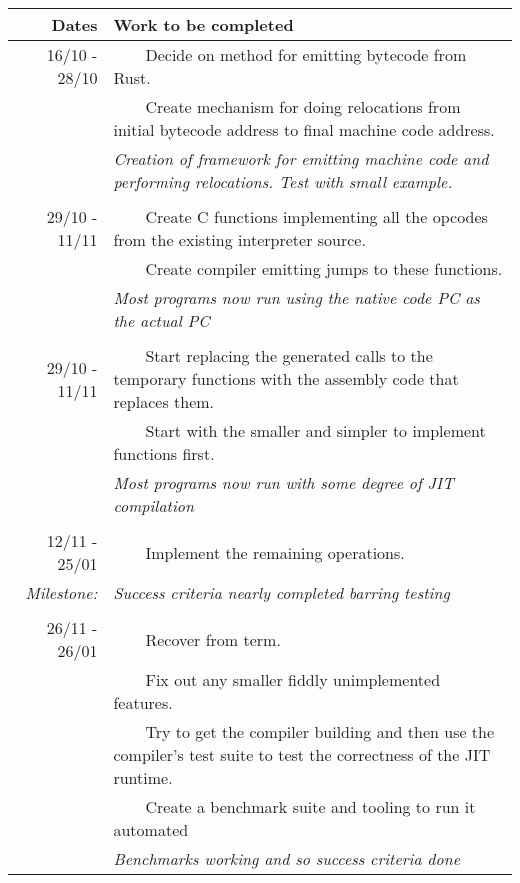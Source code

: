 \documentclass[12pt,a4paper, headings=standardclasses]{scrartcl}
\newcommand{\tabitem}{~~\llap{\textbullet}~~}
\begin{document}
\begin{tabularx}{\textwidth}{rX} \toprule
    Dates & Work to be completed \\ \midrule
    16/10 - 28/10
    &\tabitem Decide on method for emitting bytecode from Rust.\\
    &\tabitem Create mechanism for doing relocations from initial bytecode address to final machine code address.\\
    &\textit{Creation of framework for emitting machine code and performing relocations. Test with small example.} \\

    &\\

    29/10 - 11/11
    &\tabitem Create C functions implementing all the opcodes from the existing interpreter source.\\
    &\tabitem Create compiler emitting jumps to these functions.\\
    &\textit{Most programs now run using the native code PC as the actual PC} \\
    
    &\\

    29/10 - 11/11
    &\tabitem Start replacing the generated calls to the temporary functions with the assembly code that replaces them.\\
    &\tabitem Start with the smaller and simpler to implement functions first.\\
    &\textit{Most programs now run with some degree of JIT compilation} \\

    &\\

    12/11 - 25/01
    &\tabitem Implement the remaining operations.\\
    \textit{Milestone:}
    &\textit{Success criteria nearly completed barring testing} \\

    &\\

    26/11 - 26/01
    &\tabitem Recover from term.\\
    &\tabitem Fix out any smaller fiddly unimplemented features.\\
    &\tabitem Try to get the compiler building and then use the
        compiler's test suite to test the correctness of the JIT runtime.\\
    &\tabitem Create a benchmark suite and tooling to run it automated \\
    &\textit{Benchmarks working and so success criteria done} \\
\bottomrule
\end{tabularx}
\end{document}
